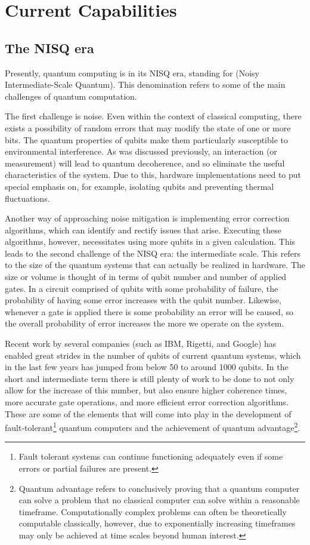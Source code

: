 \section{Current Capabilities}

\subsection{The NISQ era}
Presently, quantum computing is in its NISQ era, standing for (Noisy Intermediate-Scale Quantum). This denomination refers to some of the main challenges of quantum computation. 

The first challenge is noise. Even within the context of classical computing, there exists a possibility of random errors that may modify the state of one or more bits. The quantum properties of qubits make them particularly susceptible to environmental interference. As was discussed previously, an interaction (or measurement) will lead to quantum decoherence, and so eliminate the useful characteristics of the system. Due to this, hardware implementations need to put special emphasis on, for example, isolating qubits and preventing thermal fluctuations. 

Another way of approaching noise mitigation is implementing error correction algorithms, which can identify and rectify issues that arise. Executing these algorithms, however, necessitates using more qubits in a given calculation. This leads to the second challenge of the NISQ era: the intermediate scale. This refers to the size of the quantum systems that can actually be realized in hardware. The size or volume is thought of in terms of qubit number and number of applied gates. In a circuit comprised of qubits with some probability of failure, the probability of having some error increases with the qubit number. Likewise, whenever a gate is applied there is some probability an error will be caused, so the overall probability of error increases the more we operate on the system.

Recent work by several companies (such as IBM, Rigetti, and Google) has enabled great strides in the number of qubits of current quantum systems, which in the last few years has jumped from below 50 to around 1000 qubits. In the short and intermediate term there is still plenty of work to be done to not only allow for the increase of this number, but also ensure higher coherence times, more accurate gate operations, and more efficient error correction algorithms. These are some of the elements that will come into play in the development of fault-tolerant\footnote{Fault tolerant systems can continue functioning adequately even if some errors or partial failures are present.} quantum computers and the achievement of quantum advantage\footnote{Quantum advantage refers to conclusively proving that a quantum computer can solve a problem that no classical computer can solve within a reasonable timeframe. Computationally complex problems can often be theoretically computable classically, however, due to exponentially increasing timeframes may only be achieved at time scales beyond human interest.}.


